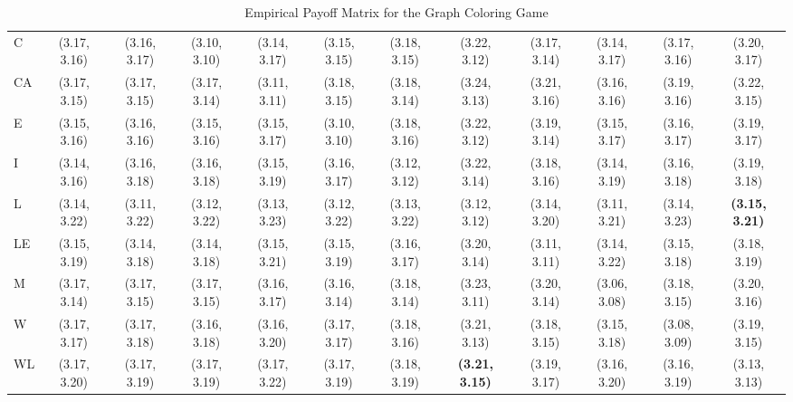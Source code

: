 \begin{flushleft}
\begin{flushleft}
\begin{table}[h!]
{\begin{tabular}{lccccccccccc}
                C  & (3.17, 3.16) & (3.16, 3.17) & (3.10, 3.10) & (3.14, 3.17) & (3.15, 3.15) & (3.18, 3.15) & (3.22, 3.12) & (3.17, 3.14) & (3.14, 3.17) & (3.17, 3.16) & (3.20, 3.17) \\
                
                CA & (3.17, 3.15) & (3.17, 3.15) & (3.17, 3.14) & (3.11, 3.11) & (3.18, 3.15) & (3.18, 3.14) & (3.24, 3.13) & \cellcolor{gray!16}(3.21, 3.16) & \cellcolor{gray!16}(3.16, 3.16) & (3.19, 3.16) & \cellcolor{gray!16}(3.22, 3.15) \\
                
                E  & (3.15, 3.16) & (3.16, 3.16) & (3.15, 3.16) & \cellcolor{gray!16}(3.15, 3.17) & (3.10, 3.10) & (3.18, 3.16) & (3.22, 3.12) & (3.19, 3.14) & (3.15, 3.17) & (3.16, 3.17) & (3.19, 3.17) \\
                
                I  & (3.14, 3.16) & (3.16, 3.18) & (3.16, 3.18) & (3.15, 3.19) & (3.16, 3.17) & (3.12, 3.12) & (3.22, 3.14) & (3.18, 3.16) & (3.14, 3.19) & (3.16, 3.18) & (3.19, 3.18) \\

                L  & (3.14, 3.22) & (3.11, 3.22) & (3.12, 3.22) & (3.13, 3.23) & (3.12, 3.22) & (3.13, 3.22) & (3.12, 3.12) & (3.14, 3.20) & (3.11, 3.21) & (3.14, 3.23) & \textbf{(3.15, 3.21)} \\
                
                LE & (3.15, 3.19) & (3.14, 3.18) & (3.14, 3.18) & (3.15, 3.21) & (3.15, 3.19) & (3.16, 3.17) & (3.20, 3.14) & (3.11, 3.11) & (3.14, 3.22) & (3.15, 3.18) & (3.18, 3.19) \\
                
                M  & (3.17, 3.14) & (3.17, 3.15) & (3.17, 3.15) & \cellcolor{gray!16}(3.16, 3.17) & (3.16, 3.14) & (3.18, 3.14) & (3.23, 3.11) & (3.20, 3.14) & (3.06, 3.08) & (3.18, 3.15) & (3.20, 3.16) \\
                
                W  & (3.17, 3.17) & (3.17, 3.18) & (3.16, 3.18) & \cellcolor{gray!16}(3.16, 3.20) & (3.17, 3.17) & (3.18, 3.16) & (3.21, 3.13) & (3.18, 3.15) & (3.15, 3.18) & (3.08, 3.09) & (3.19, 3.15) \\
            
                WL & (3.17, 3.20) & (3.17, 3.19) & (3.17, 3.19) & (3.17, 3.22) & (3.17, 3.19) & (3.18, 3.19) & \textbf{(3.21, 3.15)} & (3.19, 3.17) & \cellcolor{gray!16}(3.16, 3.20) & (3.16, 3.19) & (3.13, 3.13) \\
                \hline
            \end{tabular}
            }
            \vspace{0.5em}
            \caption{Empirical Payoff Matrix for the Graph Coloring Game}
            \label{tab:gcg_payoff_matrix}
        \end{table}


\end{flushleft}
\end{flushleft}
